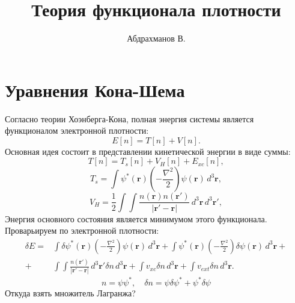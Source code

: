 \documentclass[article]{ncc}
\title{Теория функционала плотности}
\author{Абдрахманов В.}
\renewcommand{\vec}{\boldsymbol}
\begin{document}
    \maketitle
    \tableofcontents
    \section{Уравнения Кона-Шема}
    Согласно теории Хоэнберга-Кона, полная энергия системы является функционалом электронной плотности:
    \begin{equation}
        E[n] = T[n] + V[n].
    \end{equation}
    Основная идея состоит в представлении кинетической энергии в виде суммы:
    \begin{equation}
        T[n] = T_s[n] + V_H[n] + E_{xc}[n],
    \end{equation}
    \begin{equation}
        T_s = \int \psi^*(\vec{r}) \left(-\frac{\nabla^2}{2}\right) \psi(\vec{r})\,d^3\vec{r},
    \end{equation}
    \begin{equation}
        V_H = \frac{1}{2}\int\int \frac{n(\vec{r})n(\vec{r}')}{|\vec{r}' - \vec{r}|}\,d^3\vec{r}\,d^3\vec{r}',
    \end{equation}
    Энергия основного состояния является минимумом этого функционала. Проварьируем по электронной плотности:
    \begin{align}
        \delta E = & \int \delta\psi^*(\vec{r}) \left(-\frac{\nabla^2}{2}\right) \psi(\vec{r})\,d^3\vec{r} + \int \psi^*(\vec{r}) \left(-\frac{\nabla^2}{2}\right) \delta\psi(\vec{r})\,d^3\vec{r} +\\
        + & \int\int \frac{n(\vec{r}')}{|\vec{r}' - \vec{r}|}\,d^3\vec{r}'\delta n\,d^3\vec{r} + \int v_{xc} \delta n\,d^3\vec{r} + \int v_{ext} \delta n\,d^3\vec{r}.
    \end{align}
    \begin{equation}
        n = \psi\psi^*,\quad \delta n = \psi\delta\psi^* + \psi^*\delta\psi
    \end{equation}
    Откуда взять множитель Лагранжа?
\end{document}
